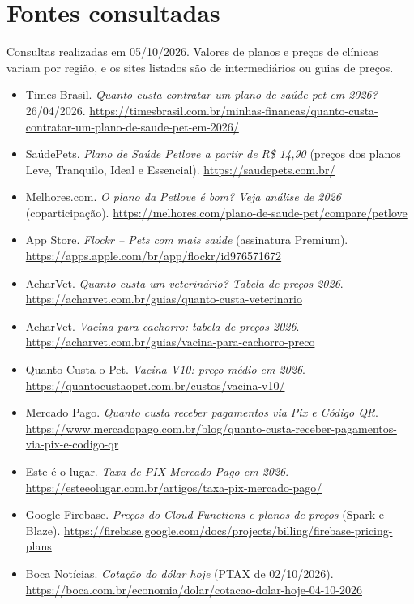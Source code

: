 \section*{Fontes consultadas}

Consultas realizadas em 05/10/2026. Valores de planos e preços de clínicas variam por
região, e os sites listados são de intermediários ou guias de preços.

\begin{itemize}[leftmargin=1.2em, itemsep=4pt]
  \item Times Brasil. \emph{Quanto custa contratar um plano de saúde pet em 2026?} 26/04/2026.
  \url{https://timesbrasil.com.br/minhas-financas/quanto-custa-contratar-um-plano-de-saude-pet-em-2026/}
  \item SaúdePets. \emph{Plano de Saúde Petlove a partir de R\$ 14,90} (preços dos planos Leve,
  Tranquilo, Ideal e Essencial). \url{https://saudepets.com.br/}
  \item Melhores.com. \emph{O plano da Petlove é bom? Veja análise de 2026} (coparticipação).
  \url{https://melhores.com/plano-de-saude-pet/compare/petlove}
  \item App Store. \emph{Flockr -- Pets com mais saúde} (assinatura Premium).
  \url{https://apps.apple.com/br/app/flockr/id976571672}
  \item AcharVet. \emph{Quanto custa um veterinário? Tabela de preços 2026}.
  \url{https://acharvet.com.br/guias/quanto-custa-veterinario}
  \item AcharVet. \emph{Vacina para cachorro: tabela de preços 2026}.
  \url{https://acharvet.com.br/guias/vacina-para-cachorro-preco}
  \item Quanto Custa o Pet. \emph{Vacina V10: preço médio em 2026}.
  \url{https://quantocustaopet.com.br/custos/vacina-v10/}
  \item Mercado Pago. \emph{Quanto custa receber pagamentos via Pix e Código QR}.
  \url{https://www.mercadopago.com.br/blog/quanto-custa-receber-pagamentos-via-pix-e-codigo-qr}
  \item Este é o lugar. \emph{Taxa de PIX Mercado Pago em 2026}.
  \url{https://esteeolugar.com.br/artigos/taxa-pix-mercado-pago/}
  \item Google Firebase. \emph{Preços do Cloud Functions e planos de preços} (Spark e Blaze).
  \url{https://firebase.google.com/docs/projects/billing/firebase-pricing-plans}
  \item Boca Notícias. \emph{Cotação do dólar hoje} (PTAX de 02/10/2026).
  \url{https://boca.com.br/economia/dolar/cotacao-dolar-hoje-04-10-2026}
\end{itemize}
